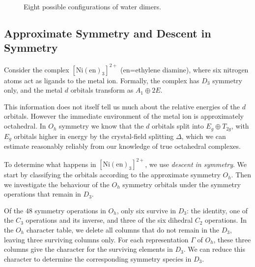 \documentclass{article}
\theoremstyle{plain}\theoremheaderfont{\normalfont\itshape}\theorembodyfont{\rmfamily}\theoremseparator{.}\newtheorem*{rem}{Remark}\newtheorem*{ex}{Example}\newtheorem*{proof}{Proof}\newtheorem*{altp}{Alternative proof}
\theoremstyle{plain}\theoremheaderfont{\normalfont\bfseries}\theorembodyfont{\rmfamily}\theoremseparator{.}\newtheorem{thm}{Theorem}[section]\newtheorem{lem}[thm]{Lemma}\newtheorem{prop}[thm]{Proposition}\newtheorem*{cor}{Corollary}\newtheorem{defn}[thm]{Definition}\newtheorem{clm}[thm]{Claim}\newtheorem{clminproof}{Claim}\newtheorem*{law}{Law}\newtheorem{pos}[thm]{Postulate}
\theoremstyle{break}\theoremheaderfont{\normalfont\itshape}\theorembodyfont{\rmfamily}\theoremseparator{.\medskip}\newtheorem*{proofskip}{Proof}\newtheorem*{exs}{Examples}\newtheorem*{rems}{Remarks}
\theoremstyle{break}\theoremheaderfont{\normalfont\bfseries}\theorembodyfont{\rmfamily}\theoremseparator{.\medskip}\newtheorem{lemskip}[thm]{Lemma}\newtheorem{defnskip}[thm]{Definition}\newtheorem{propskip}[thm]{Proposition}\newtheorem{thmskip}[thm]{Theorem}
\numberwithin{equation}{section}
\begin{document}
\begin{figure}
        \caption{Eight possible configurations of water dimers.}
    \end{figure}

    \subsection{Approximate Symmetry and Descent in Symmetry}
    Consider the complex \(\mathrm{[Ni(en)_3]^{2+}}\) (\(\mathrm{en}\)=ethylene diamine), where six nitrogen atoms act as ligands to the metal ion. Formally, the complex has \(D_3\) symmetry only, and the metal \(d\) orbitals transform as \(A_1\oplus 2E\).

    This information does not itself tell us much about the relative energies of the \(d\) orbitals. However the immediate environment of the metal ion is approximately octahedral. In \(O_h\) symmetry we know that the \(d\) orbitals split into \(E_g\oplus T_{2g}\), with \(E_g\) orbitals higher in energy by the crystal-field splitting \(\Delta\), which we can estimate reasonably reliably from our knowledge of true octahedral complexes.

    To determine what happens in \(\mathrm{[Ni(en)_3]^{2+}}\), we use \textit{descent in symmetry}. We start by classifying the orbitals according to the approximate symmetry \(O_h\). Then we investigate the behaviour of the \(O_h\) symmetry orbitals under the symmetry operations that remain in \(D_3\).

    Of the 48 symmetry operations in \(O_h\), only six survive in \(D_3\): the identity, one of the \(C_3\) operations and its inverse, and three of the six dihedral \(C_2\) operations. In the \(O_h\) character table, we delete all columns that do not remain in the \(D_3\), leaving three surviving columns only. For each representation \(\Gamma\) of \(O_h\), these three columns give the character for the surviving elements in \(D_3\). We can reduce this character to determine the corresponding symmetry species in \(D_3\).
\end{document}
